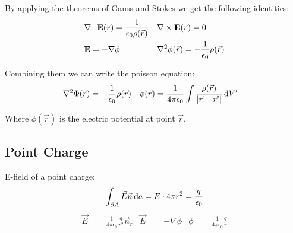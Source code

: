 \documentclass[a4paper, fontsize=8pt, landscape, DIV=1]{scrartcl}
\begin{document}
\begin{multicols*}{4}
  By applying the theorems of Gauss and Stokes we get the following identities:
  \begin{align*}
    &\nabla \cdot \mathbf{E}(\vec{r}) = \frac{1}{\epsilon_0\rho(\vec{r})} & &\nabla\times\mathbf{E}(\vec{r}) = 0 \\
    &\mathbf{E} = -\nabla\phi & &\nabla^2\phi(\vec{r}) = -\frac{1}{\epsilon_0}\rho(\vec{r})
  \end{align*}

  Combining them we can write the poisson equation:
  \begin{align*}
    \nabla^2\Phi(\vec{r}) &= -\frac{1}{\epsilon_0}\rho(\vec{r}) &
    \phi(\vec{r}) &= \frac{1}{4\pi\epsilon_0}\int\frac{\rho(\vec{r})}{|\vec{r}-\vec{r}'|}\,\mathrm{d} V'
  \end{align*}

  Where $\phi(\vec{r})$ is the electric potential at point $\vec{r}$.

  \subsection{Point Charge}
  E-field of a point charge:
    \[\int_{\partial A} \vec{E}\vec{n} \,\mathrm{d} a = E\cdot4\pi r^2 = \frac{q}{\epsilon_0} \]
  \begin{align*}
    \vec{E} &= \frac{1}{4\pi\epsilon_0}\frac{q}{r^2}\vec{n}_r & \vec{E}&=-\nabla\phi & \phi&=\frac{1}{4\pi\epsilon_0}\frac{q}{r}
  \end{align*}



\end{multicols*}

\setcounter{secnumdepth}{2}
\end{document}
